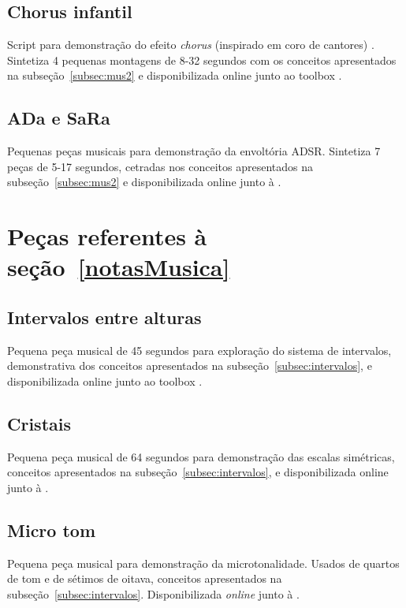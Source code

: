 \clearpage


\subsection{Chorus infantil}\label{ap:chorus}
Script para demonstração do efeito \emph{chorus} (inspirado em coro de cantores) . Sintetiza 4 pequenas montagens de 8-32 segundos com os conceitos apresentados na subseção~\ref{subsec:mus2} e disponibilizada online junto ao toolbox \massa.\cite{MASSA}



\subsection{ADa e SaRa}\label{ap:ada}
Pequenas peças musicais para demonstração da envoltória ADSR. Sintetiza 7 peças de 5-17 segundos, cetradas nos conceitos apresentados na subseção~\ref{subsec:mus2} e disponibilizada online junto à \massa.\cite{MASSA}


\clearpage

\section{Peças referentes à seção~\ref{notasMusica}}
\subsection{Intervalos entre alturas}\label{ap:intervalos}
Pequena peça musical de 45 segundos para exploração do sistema de intervalos, demonstrativa dos conceitos apresentados na subseção~\ref{subsec:intervalos}, e disponibilizada online junto ao toolbox \massa.


\subsection{Cristais}\label{ap:cristais}
Pequena peça musical de 64 segundos para demonstração das escalas simétricas, conceitos apresentados na subseção~\ref{subsec:intervalos}, e disponibilizada online junto à \massa.\cite{MASSA}

\clearpage


\subsection{Micro tom}\label{ap:micro}
Pequena peça musical para demonstração da microtonalidade. Usados de quartos de tom e de sétimos de oitava, conceitos apresentados na subseção~\ref{subsec:intervalos}. Disponibilizada \emph{online} junto à \massa.\cite{MASSA}


